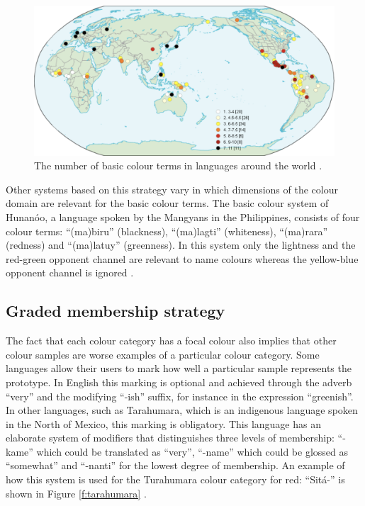 \begin{figure}[htbp]
  \begin{center}
    \includegraphics[width=\textwidth]{./intro/figures/number-bcts.pdf}
    \caption[The number of basic colour terms around the world]{The
      number of basic colour terms in languages around the world
      \citep{kay08number}.}
    \label{f:number-bcts}
  \end{center}
\end{figure}

Other systems based on this strategy vary in which dimensions of the
colour domain are relevant for the basic colour terms. The basic
colour system of Hunan\'oo, a language spoken by the Mangyans in the
Philippines, consists of four colour terms: ``(ma)biru'' (blackness),
``(ma)lagti'' (whiteness), ``(ma)rara'' (redness) and ``(ma)latuy''
(greenness). In this system only the lightness and the red-green
opponent channel are relevant to name colours whereas the yellow-blue
opponent channel is ignored \citep{conklin55hanunoo}.

\subsection{Graded membership strategy}

The fact that each colour category has a focal colour also
implies that other colour samples are worse examples of a particular
colour category. Some languages allow their users to mark how well a
particular sample represents the prototype. In English this marking is
optional and achieved through the adverb ``very'' and the modifying
``-ish'' suffix, for instance in the expression ``greenish''. In other
languages, such as Tarahumara, which is an indigenous language spoken
in the North of Mexico, this marking is obligatory. This language has
an elaborate system of modifiers that distinguishes three levels of
membership: ``-kame'' which could be translated as ``very'', ``-name''
which could be glossed as ``somewhat'' and ``-nanti'' for the lowest
degree of membership. An example of how this system is used for the
Turahumara colour category for red: ``Sit\'a-'' is shown in Figure
\ref{f:tarahumara} \citep{burgress83tarahumara}.

